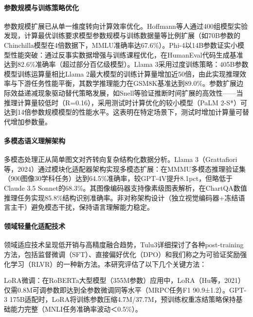 \documentclass[professional,privacy,print,win,long,STEM,AutoFakeBold]{def/buaa}
\begin{document}
\paragraph{参数规模与训练策略优化}

参数规模扩展已从单一维度转向计算效率优化。Hoffmann等人通过400组模型实验发现，计算最优训练要求模型参数规模与训练数据量等比例扩展（如70B参数的Chinchilla模型在4倍数据下，MMLU准确率达67.6\%）。Phi-4以14B参数证实小模型性能突破：通过反事实数据增强与训练课程优化，在HumanEval代码生成基准达到82.6\%准确率（超过部分百亿级模型）。Llama 3采用过度训练策略：405B参数模型训练运算量相比Llama 2最大模型的训练计算量增加近50倍，由此实现推理效率与下游任务性能平衡，其数学推理能力在GSM8K基准达到89.0\%。参数扩展边际效益递减现象驱动替代策略发展，如Snell等验证推断时间扩展的高效性——当推理计算量较低时（R=0.16），采用测试时计算优化的较小模型（PaLM 2-S*）可达到14倍参数规模模型的性能水平。这表明在特定场景下，测试时增加计算量可替代增加参数量。

\paragraph{多模态语义理解架构}

多模态处理正从简单图文对齐转向复杂结构化数据分析。Llama 3（Grattafiori等，2024）通过模块化适配器架构实现多模态扩展：在MMMU多模态推理验证集（900图像30学科任务）达到64.5\%准确率，较GPT-4V提升8.1pct，但略低于Claude 3.5 Sonnet的68.3\%。其图像编码器支持像素级图表解析，在ChartQA数值推理任务实现85.8\%结构识别准确率。非对称架构设计（独立视觉编码器+冻结语言主干）避免模态干扰，保持语言理解能力稳定。

\paragraph{领域轻量化适配技术}

领域适应技术呈现低开销与高精度融合趋势，Tulu3详细探讨了各种post-training方法，包括监督微调（SFT）、直接偏好优化（DPO）和我们称之为可验证奖励强化学习（RLVR）的一种新方法。本研究评估了以下几个关键方法：

LoRA微调：在RoBERTa大型模型（355M参数）应用中，LoRA（Hu等，2021）仅需0.8M可调参数即达到全参数微调同等水平（MRPC任务F1 90.9±1.2）。GPT-3 175B适配时，LoRA将训练参数压缩4.7M/37.7M，预训练权重冻结策略保持基础能力完整（MNLI任务准确率波动＜0.5\%）。
\end{document}
